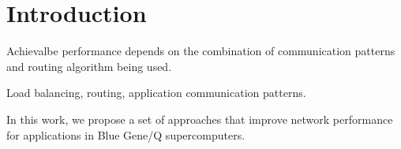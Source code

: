 \section{Introduction}
Achievalbe performance depends on the combination of communication patterns and routing algorithm being used.

Load balancing, routing, application communication patterns.

In this work, we propose a set of approaches that improve network performance for applications in Blue Gene/Q supercomputers. 
